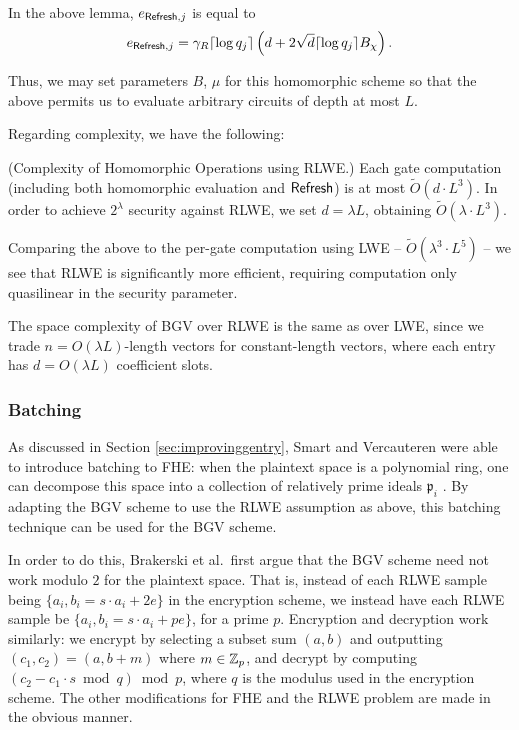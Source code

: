     In the above lemma, $e_{{\sf Refresh}, j}$ is equal to
    \[e_{{\sf Refresh}, j} = \gamma_R \lceil \log q_j \rceil \left(d + 2 \sqrt{d} \lceil \log q_j \rceil B_\chi \right).\]

    Thus, we may set parameters $B$, $\mu$ for this homomorphic scheme so that the above permits us to evaluate arbitrary circuits of depth at most $L$.

    Regarding complexity, we have the following:
    \begin{lemma} \label{lem:rlwecomplexity} (Complexity of Homomorphic Operations using RLWE.)
        Each gate computation (including both homomorphic evaluation and ${\sf Refresh}$) is at most $\widetilde{O}(d \cdot L^3).$ In order to achieve $2^\lambda$ security against RLWE, we set $d = \lambda L$, obtaining $\widetilde{O}(\lambda \cdot L^3)$.
    \end{lemma}

    Comparing the above to the per-gate computation using LWE -- $\widetilde{O}(\lambda^3 \cdot L^5)$ -- we see that RLWE is significantly more efficient, requiring computation only quasilinear in the security parameter.

    The space complexity of BGV over RLWE is the same as over LWE, since we trade $n = O(\lambda L)$-length vectors for constant-length vectors, where each entry has $d = O(\lambda L)$ coefficient slots.

    \subsubsection{Batching}
    As discussed in Section \ref{sec:improvinggentry}, Smart and Vercauteren were able to introduce batching to FHE: when the plaintext space is a polynomial ring, one can decompose this space into a collection of relatively prime ideals $\mathfrak{p}_i$ \cite{SV09}. By adapting the BGV scheme to use the RLWE assumption as above, this batching technique can be used for the BGV scheme.

    In order to do this, Brakerski et al.~first argue that the BGV scheme need not work modulo $2$ for the plaintext space. That is, instead of each RLWE sample being $\{a_i, b_i = s \cdot a_i + 2 e\}$ in the encryption scheme, we instead have each RLWE sample be $\{a_i, b_i = s \cdot a_i + p e\}$, for a prime $p$. Encryption and decryption work similarly: we encrypt by selecting a subset sum $(a, b)$ and outputting $(c_1, c_2) = (a, b + m)$ where $m \in \mathbb{Z}_p$, and decrypt by computing $(c_2 - c_1 \cdot s \bmod q) \bmod p$, where $q$ is the modulus used in the encryption scheme. The other modifications for FHE and the RLWE problem are made in the obvious manner.

